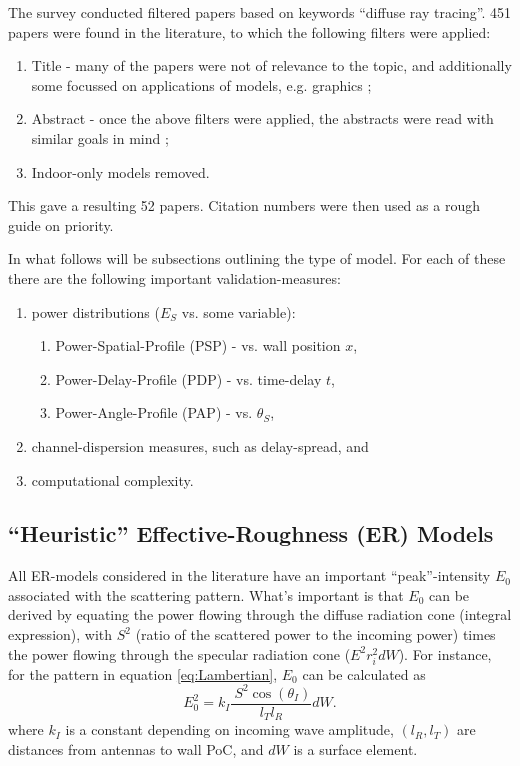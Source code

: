 \documentclass[lettersize,journal]{IEEEtran}
\begin{document}
The survey conducted filtered papers based on keywords ``diffuse ray tracing''. 451 papers were found in the literature, to which the following filters were applied:
\begin{enumerate}
    \item Title - many of the papers were not of relevance to the topic, and additionally some focussed on applications of models, e.g. graphics ;
    \item Abstract - once the above filters were applied, the abstracts were read with similar goals in mind ;
    \item Indoor-only models removed.
\end{enumerate}
This gave a resulting 52 papers. Citation numbers were then used as a rough guide on priority.

In what follows will be subsections outlining the type of model. For each of these there are the following important validation-measures:
\begin{enumerate}
	\item power distributions ($E_S$ vs. some variable):
	\begin{enumerate}
		\item Power-Spatial-Profile (PSP) - vs. wall position $x$,
		\item Power-Delay-Profile (PDP) - vs. time-delay $t$,
		\item Power-Angle-Profile (PAP) - vs. $\theta_S$,
	\end{enumerate}
	\item channel-dispersion measures, such as delay-spread, and
	\item computational complexity.
\end{enumerate}

\subsection{``Heuristic'' Effective-Roughness (ER) Models} \label{heuristicModels}
All ER-models considered in the literature have an important ``peak''-intensity $E_0$ associated with the scattering pattern. What's important is that $E_0$ can be derived by equating the power flowing through the diffuse radiation cone (integral expression), with $S^2$ (ratio of the scattered power to the incoming power) times the power flowing through the specular radiation cone ($E^2r_i^2dW$). For instance, for the pattern in equation \eqref{eq:Lambertian}, $E_0$ can be calculated \cite{ref:degliSecond} as
\begin{equation}
E_{0}^2 = k_I \frac{ \ S^2 \cos(\theta_I)}{l_T l_R} dW. \label{eq:LambertianPower}
\end{equation}
where $k_I$ is a constant depending on incoming wave amplitude, $(l_R, l_T)$ are distances from antennas to wall PoC, and $dW$ is a surface element.
\end{document}
